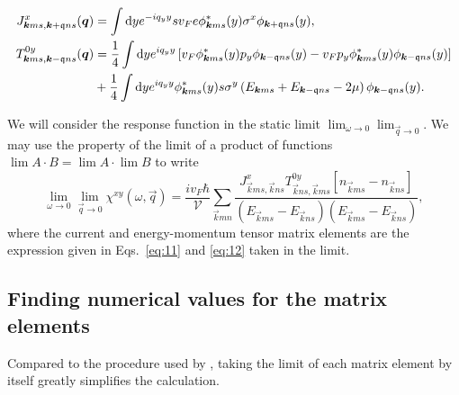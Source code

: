 \begin{align}\label{eq:11}
  J^x_{\bm{k}ms, \bm{k}+\mathfrak{q}ns}(\bm{q}) &= \int \mathrm{d}y
                                                e^{-i q_y y}
                                                s v_F e\phi ^{*}_{\bm{k}m s}(y) \sigma^x
                                                \phi _{\bm{k}+\mathfrak{q}n s}(y),\\
  T^{0y}_{\bm{k} m s, \bm{k}-\mathfrak{q} n s}(\bm{q}) &= \frac{1}{4} \label{eq:12}
                                                           \int \mathrm{d}y
                                                           e^{iq_y y}
                                                           \left[
                                                           v_F \phi ^{*}_{\bm{k}m s}(y) p_y
                                                           \phi _{\bm{k}-\mathfrak{q}n s}(y)
                                                           -
                                                           v_Fp_y \phi ^{*}_{\bm{k}m s}(y)
                                                           \phi _{\bm{k}-\mathfrak{q}n s}(y)
                                                           \right]\\
  \nonumber &+ \frac{1}{4} 
              \int \mathrm{d}y
              e^{iq_y y}
              \phi ^{*}_{\bm{k}m s}(y)
              s\sigma ^y
              \left(
              E_{\bm{k}m s} + E_{\bm{k}-\mathfrak{q} n s} - 2 \mu  
              \right)
              \phi _{\bm{k}-\mathfrak{q} n s}(y).
\end{align}

We will consider the response function in the static limit \( \lim_{\omega \to 0} \lim_{\vec{q} \to 0} \).
We may use the property of the limit of a product of functions \( \lim A\cdot B = \lim A \cdot \lim B \) to write
\begin{equation}
  \lim_{\omega \to 0} \lim_{\vec{q} \to 0} \chi^{xy}(\omega, \vec{q}) = \frac{i v_F \hbar}{\mathcal{V}} \sum\limits_{\vec{k} m n}^{}
  \frac{
    J^x_{\vec{k} m s, \vec{k} n s} T^{0y}_{\vec{k} n s, \vec{k} m s} [n_{\vec{k} m s} - n_{\vec{k} n s}]
  }{
    (E_{\vec{k} m s} - E_{\vec{k} n s}) (E_{\vec{k} m s}- E_{\vec{k} n s})
  },
\end{equation}
where the current and energy-momentum tensor matrix elements are the expression given in Eqs.~\eqref{eq:11} and \eqref{eq:12} taken in the limit.


\subsection{Finding numerical values for the matrix elements}
Compared to the procedure used by \citeauthor{arjonaFingerprintsConformalAnomaly2019}\cite{arjonaFingerprintsConformalAnomaly2019}, taking the limit of each matrix element by itself greatly simplifies the calculation.

